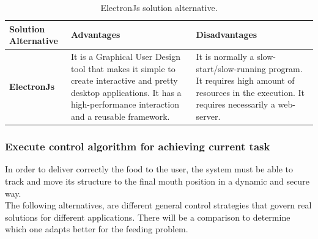 \documentclass[11pt]{report} %
\begin{document}
\begin{table}[H]
\begin{center}
    \begin{tabular}{M{6.6cm}M{3.3cm}M{3.3cm}}
    \hline
    \textbf{Solution Alternative} & \textbf{Advantages} & \textbf{Disadvantages} \\ 
    \hline

    \textbf{ElectronJs}
    

    \citep{cite_electron_js}
    
    &
    
    It is a Graphical User Design tool that makes it simple to create interactive and pretty desktop applications. It has a high-performance interaction and a reusable framework.
    
    &
    
    It is normally a slow-start/slow-running program. It requires high amount of resources in the execution. It requires necessarily a web-server.
    
    \\ \hline
    \end{tabular}
\caption{\label{tab:electronjs} ElectronJs solution alternative.}
\end{center}
\end{table}


\subsubsection{Execute control algorithm for achieving current task}

In order to deliver correctly the food to the user, the system must be able to track and move its structure to the final mouth position in a dynamic and secure way.\\

The following alternatives, are different general control strategies that govern real solutions for different applications. There will be a comparison to determine which one adapts better for the feeding problem.\\
\end{document}
